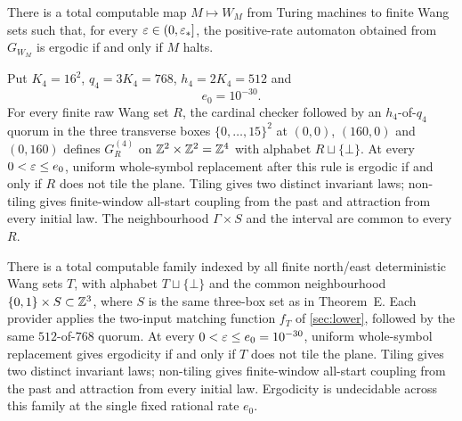 \begin{mainA}
There is a total computable map $M\mapsto W_M$ from Turing machines to finite Wang sets such that, for every $\varepsilon\in(0,\varepsilon_*]$, the positive-rate automaton obtained from $G_{W_M}$ is ergodic if and only if $M$ halts.
\end{mainA}
\begin{mainE}
Put $K_4=16^2$, $q_4=3K_4=768$, $h_4=2K_4=512$ and
\[
  e_0=10^{-30}.
\]
For every finite raw Wang set $R$, the cardinal checker followed by an $h_4$-of-$q_4$ quorum in the
three transverse boxes $\{0,\dots,15\}^2$ at $(0,0)$, $(160,0)$ and $(0,160)$ defines $G^{(4)}_R$ on
$\mathbb{Z}^2\times\mathbb{Z}^2=\mathbb{Z}^4$ with alphabet $R\sqcup\{\bot\}$. At every
$0<\varepsilon\le e_0$, uniform whole-symbol replacement after this rule is ergodic if and only if
$R$ does not tile the plane. Tiling gives two distinct invariant laws; non-tiling gives
finite-window all-start coupling from the past and attraction from every initial law. The
neighbourhood $\Gamma\times S$ and the interval are common to every $R$.
\end{mainE}

\begin{mainF}
There is a total computable family indexed by all finite north/east deterministic Wang sets $T$,
with alphabet $T\sqcup\{\bot\}$ and the common neighbourhood $\{0,1\}\times S\subset\mathbb{Z}^3$,
where $S$ is the same three-box set as in Theorem~E. Each provider applies the two-input matching
function $f_T$ of \cref{sec:lower}, followed by the same $512$-of-$768$ quorum. At every
$0<\varepsilon\le e_0=10^{-30}$, uniform whole-symbol replacement gives ergodicity if and only if
$T$ does not tile the plane. Tiling gives two distinct invariant laws; non-tiling gives
finite-window all-start coupling from the past and attraction from every initial law. Ergodicity
is undecidable across this family at the single fixed rational rate $e_0$.
\end{mainF}

